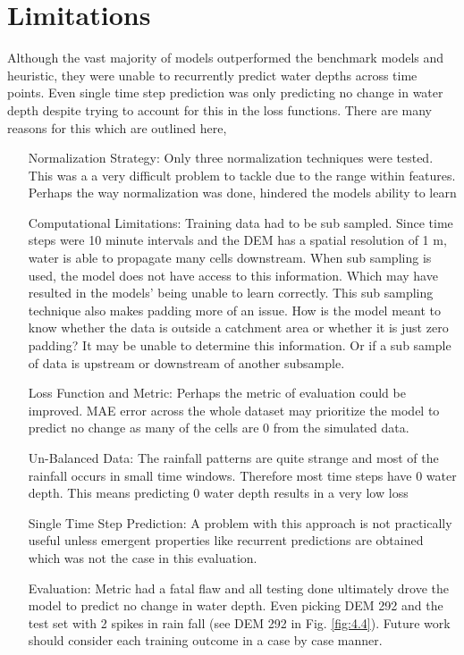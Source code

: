 \section{Limitations}
Although the vast majority of models outperformed the benchmark models and heuristic, they were unable to recurrently predict water depths across time points. Even single time step prediction was only predicting no change in water depth despite trying to account for this in the loss functions. There are many reasons for this which are outlined here,
\begin{enumerate}[align=left]
	\item[Normalization Strategy: ]  Only three normalization techniques were tested. This was a a very difficult problem to tackle due to the range within features. Perhaps the way normalization was done, hindered the models ability to learn
	\item[Computational Limitations: ] Training data had to be sub sampled. Since time steps were 10 minute intervals and the DEM has a spatial resolution of 1 m, water is able to propagate many cells downstream. When sub sampling is used, the model does not have access to this information. Which may have resulted in the models' being unable to learn correctly. This sub sampling technique also makes padding more of an issue. How is the model meant to know whether the data is outside a catchment area or whether it is just zero padding? It may be unable to determine this information. Or if a sub sample of data is upstream or downstream of another subsample.
	\item[Loss Function and Metric: ] Perhaps the metric of evaluation could be improved. MAE error across the whole dataset may prioritize the model to predict no change as many of the cells are 0 from the simulated data. 
	\item[Un-Balanced Data: ] The rainfall patterns are quite strange and most of the rainfall occurs in small time windows. Therefore most time steps have 0 water depth. This means predicting 0 water depth results in a very low loss
	\item[Single Time Step Prediction: ] A problem with this approach is not practically useful unless emergent properties like recurrent predictions are obtained which was not the case in this evaluation.
	\item[Evaluation: ] Metric had a fatal flaw and all testing done ultimately drove the model to predict no change in water depth. Even picking DEM 292 and the test set with 2 spikes in rain fall (see DEM 292 in Fig. \ref{fig:4.4}). Future work should consider each training outcome in a case by case manner.
\end{enumerate}

